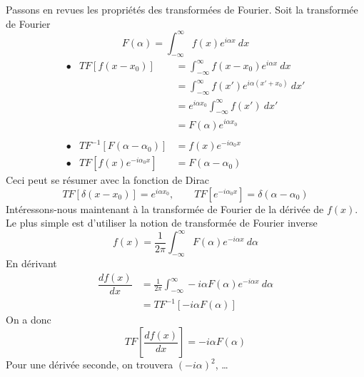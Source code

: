 Passons en revues les propriétés des transformées de Fourier. Soit la transformée de Fourier
\begin{equation}
F(\alpha) = \int_{-\infty}^\infty f(x)e^{i\alpha x}\ dx
\end{equation}
\begin{equation}
\begin{array}{lll}
\bullet & TF[f(x-x_0)] &= \int_{-\infty}^\infty f(x-x_0)e^{i\alpha x}\ dx\\
&&= \int_{-\infty}^\infty f(x')e^{i\alpha (x'+x_0)}\ dx'\\
&&= e^{i\alpha x_0}\int_{-\infty}^\infty f(x')\ dx'\\
&&= F(\alpha)e^{i\alpha x_0}\ \\
\ \\
\bullet & TF^{-1}[F(\alpha-\alpha_0)] &= f(x)e^{-i\alpha_0 x}\\
\bullet & TF[f(x)e^{-i\alpha_0x}] &= F(\alpha-\alpha_0)
\end{array}
\end{equation}
Ceci peut se résumer avec la fonction de Dirac
\begin{equation}
TF[\delta(x-x_0)] = e^{i\alpha x_0},\qquad TF[e^{-i\alpha_0x}] = \delta(\alpha-\alpha_0)
\end{equation}
Intéressons-nous maintenant à la transformée de Fourier de la dérivée de $f(x)$. Le plus 
simple est d'utiliser la notion de transformée de Fourier inverse
\begin{equation}
f(x) = \frac{1}{2\pi}\int_{-\infty}^\infty F(\alpha)e^{-i\alpha x}\ d\alpha
\end{equation}
En dérivant
\begin{equation}
\begin{array}{ll}
\dfrac{df(x)}{dx} &= \frac{1}{2\pi}\int_{-\infty}^\infty -i\alpha F(\alpha)e^{-i\alpha x}\ 
d\alpha\\
&= TF^{-1}[-i\alpha F(\alpha)]
\end{array}
\end{equation}
On a donc
\begin{equation}
TF\left[\dfrac{df(x)}{dx}\right] = -i\alpha F(\alpha)
\end{equation}
Pour une dérivée seconde, on trouvera $(-i\alpha)^2$, \dots\\

